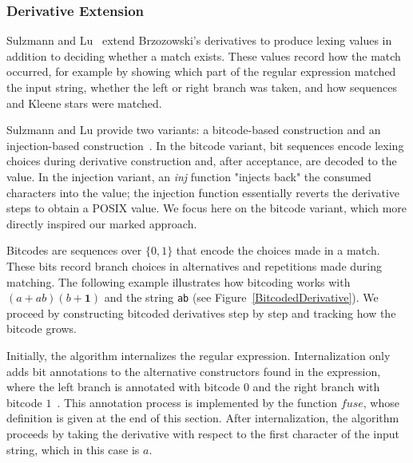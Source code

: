 \documentclass[12pt]{article}
\newcommand{\ONE}{\textbf{1}}
\newcommand{\fuse}{\textit{fuse}}
\begin{document}
\FloatBarrier
\subsubsection{Derivative Extension}

Sulzmann and Lu~\cite{Sulzmann2014} extend Brzozowski’s derivatives to produce 
lexing values in addition to deciding whether a match exists. 
These values record how the match occurred, for example by showing which part
of the regular expression matched the input string, whether the left or right
branch was taken, and how sequences and Kleene stars were matched.


Sulzmann and Lu provide two variants: a bitcode-based construction and an
injection-based construction~\cite{Sulzmann2014}.  
In the bitcode variant, bit sequences encode lexing choices during derivative
construction and, after acceptance, are decoded to the value. In the injection
variant, an \textit{inj} function "injects back" the consumed characters into
the value; the injection function essentially reverts the derivative steps to
obtain a POSIX value. We focus here on the bitcode variant, which more directly
inspired our marked approach.

Bitcodes are sequences over $\{0,1\}$ that encode the choices made in a match. These bits record
branch choices in alternatives and repetitions made during matching. The following example
illustrates how bitcoding works with $(a+ab)(b+\ONE)$ and the string \texttt{ab} (see
Figure~\ref{BitcodedDerivative}). We proceed by constructing bitcoded derivatives step by step
and tracking how the bitcode grows.

Initially, the algorithm internalizes the regular expression.  
Internalization only adds bit annotations to the alternative constructors found in the expression, 
where the left branch is annotated with bitcode $0$ and the right branch with bitcode $1$~\cite{Sulzmann2014}.  
This annotation process is implemented by the function $\fuse$, whose definition is given at the end of this section.  
After internalization, the algorithm proceeds by taking the derivative with respect to the first character 
of the input string, which in this case is $a$.
\end{document}
